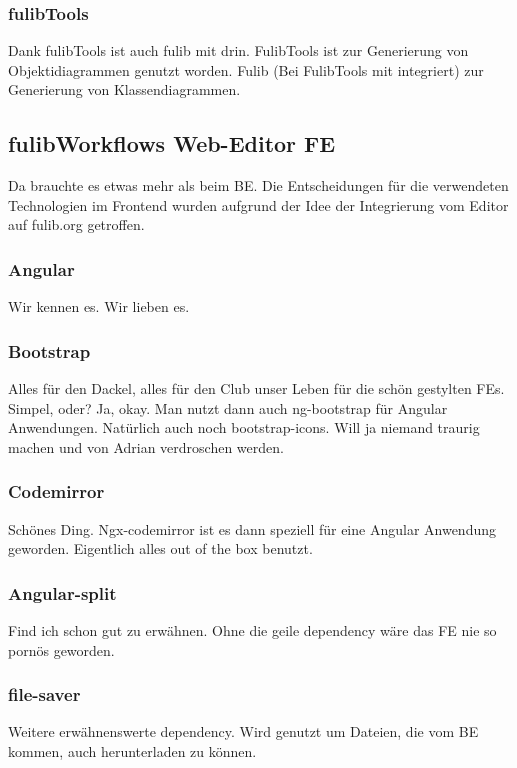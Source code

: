 \subsubsection{fulibTools}
\todo
Dank fulibTools ist auch fulib mit drin.
FulibTools ist zur Generierung von Objektidiagrammen genutzt worden.
Fulib (Bei FulibTools mit integriert) zur Generierung von Klassendiagrammen.

\subsection{fulibWorkflows Web-Editor FE}\label{subsec:fulibworkflows-web-editor}
\todo
Da brauchte es etwas mehr als beim BE\@.
Die Entscheidungen für die verwendeten Technologien im Frontend wurden aufgrund
der Idee der Integrierung vom Editor auf fulib.org getroffen.

\subsubsection{Angular}
\todo
Wir kennen es.
Wir lieben es.

\subsubsection{Bootstrap}
\todo
Alles für den Dackel, alles für den Club unser Leben für die schön gestylten FEs.
Simpel, oder?
Ja, okay.
Man nutzt dann auch ng-bootstrap für Angular Anwendungen.
Natürlich auch noch bootstrap-icons.
Will ja niemand traurig machen und von Adrian verdroschen werden.

\subsubsection{Codemirror}
\todo
Schönes Ding.
Ngx-codemirror ist es dann speziell für eine Angular Anwendung geworden.
Eigentlich alles out of the box benutzt.

\subsubsection{Angular-split}
\todo
Find ich schon gut zu erwähnen.
Ohne die geile dependency wäre das FE nie so pornös geworden.

\subsubsection{file-saver}
\todo
Weitere erwähnenswerte dependency.
Wird genutzt um Dateien, die vom BE kommen, auch herunterladen zu können.

